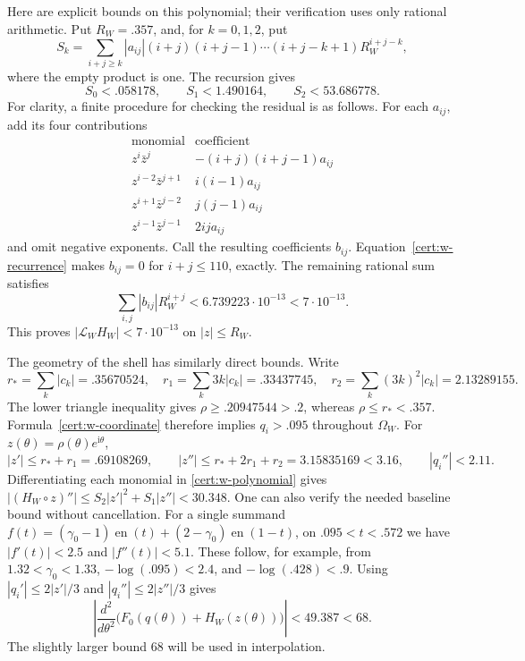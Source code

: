 \documentclass[11pt]{article}
\numberwithin{equation}{section}
\theoremstyle{definition}
\theoremstyle{remark}
\begin{document}
Here are explicit bounds on this polynomial; their verification uses
only rational arithmetic.  Put $R_W=.357$, and, for $k=0,1,2$, put
\[
 S_k=\sum_{i+j\ge k}|a_{ij}|(i+j)(i+j-1)\cdots(i+j-k+1)
                      R_W^{i+j-k},
\]
where the empty product is one.  The recursion gives
\begin{equation}
 S_0<.058178,
 \qquad S_1<1.490164,
 \qquad S_2<53.686778.
 \label{cert:w-norms}
\end{equation}
For clarity, a finite procedure for checking the residual is as follows.
For each $a_{ij}$, add its four contributions
\[
 \begin{array}{c|c}
 \text{monomial}&\text{coefficient}\\ \hline
 z^i\bar z^j&-(i+j)(i+j-1)a_{ij}\\
 z^{i-2}\bar z^{j+1}&i(i-1)a_{ij}\\
 z^{i+1}\bar z^{j-2}&j(j-1)a_{ij}\\
 z^{i-1}\bar z^{j-1}&2ij a_{ij}
 \end{array}
\]
and omit negative exponents.  Call the resulting coefficients $b_{ij}$.
Equation~\eqref{cert:w-recurrence} makes $b_{ij}=0$ for $i+j\le110$,
exactly.  The remaining rational sum satisfies
\begin{equation}
 \sum_{i,j}|b_{ij}|R_W^{i+j}<6.739223\cdot10^{-13}<7\cdot10^{-13}.
 \label{cert:w-residual}
\end{equation}
This proves $|\mathcal L_WH_W|<7\cdot10^{-13}$ on $|z|\le R_W$.

The geometry of the shell has similarly direct bounds.  Write
\[
 r_* =\sum_k|c_k|=.35670524,\quad
 r_1=\sum_k3k|c_k|=.33437745,\quad
 r_2=\sum_k(3k)^2|c_k|=2.13289155.
\]
The lower triangle inequality gives $\rho\ge.20947544>.2$, whereas
$\rho\le r_*<.357$.  Formula~\eqref{cert:w-coordinate} therefore implies
$q_i>.095$ throughout $\Omega_W$.  For $z(\theta)=\rho(\theta)e^{\mathrm i\theta}$,
\begin{equation}
 |z'|\le r_*+r_1=.69108269,
 \qquad |z''|\le r_*+2r_1+r_2=3.15835169<3.16,
 \qquad |q_i''|<2.11.
 \label{cert:w-curve-derivatives}
\end{equation}
Differentiating each monomial in \eqref{cert:w-polynomial} gives
$|(H_W\circ z)''|\le S_2|z'|^2+S_1|z''|<30.348$.
One can also verify the needed baseline bound without cancellation.
For a single summand
$f(t)=(\gamma _0-1)\operatorname{en}(t)+(2-\gamma _0)\operatorname{en}(1-t)$, on
$.095<t<.572$ we have $|f'(t)|<2.5$ and $|f''(t)|<5.1$.
These follow, for example, from $1.32<\gamma _0<1.33$,
$-\log(.095)<2.4$, and $-\log(.428)<.9$.
Using $|q_i'|\le2|z'|/3$ and $|q_i''|\le2|z''|/3$ gives
\begin{equation}
 \left|\frac{d^2}{d\theta^2}
       \bigl(F_0(q(\theta))+H_W(z(\theta))\bigr)\right|
 <49.387<68.
 \label{cert:w-curvature}
\end{equation}
The slightly larger bound 68 will be used in interpolation.
\end{document}
